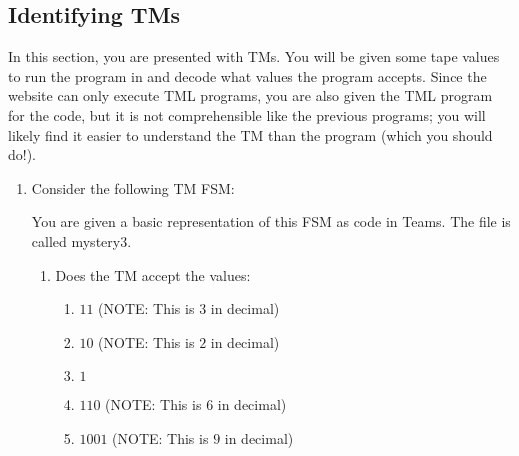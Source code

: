 \subsection{Identifying TMs}
In this section, you are presented with TMs. You will be given some tape values to run the program in and decode what values the program accepts. Since the website can only execute TML programs, you are also given the TML program for the code, but it is not comprehensible like the previous programs; you will likely find it easier to understand the TM than the program (which you should do!). 
\begin{enumerate}
    \item Consider the following TM FSM:
    \begin{figure}[H]
        \centering
    \end{figure}
    You are given a basic representation of this FSM as code in Teams. The file is called mystery3.
    \begin{enumerate}
        \item Does the TM accept the values:
        \begin{enumerate}
            \item $11$ (NOTE: This is $3$ in decimal)
            \item $10$ (NOTE: This is $2$ in decimal)
            \item $1$
            \item $110$ (NOTE: This is $6$ in decimal)
            \item $1001$ (NOTE: This is $9$ in decimal)
        \end{enumerate}
        

\end{enumerate}
\end{enumerate}
